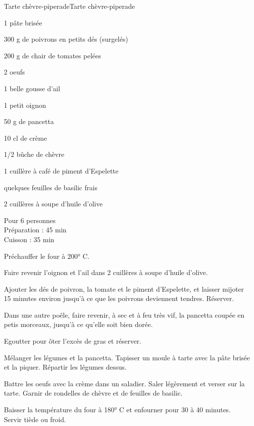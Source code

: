 \begin{recette}{Tarte chèvre-piperade}{Tarte chèvre-piperade}

\begin{ingredients}
1 pâte brisée\par
300 g de poivrons en petits dés (surgelés)\par
200 g de chair de tomates pelées\par
2 oeufs\par
1 belle gousse d'ail\par
1 petit oignon\par
50 g de pancetta\par
10 cl de crème\par
1/2 bûche de chèvre\par
1 cuillère à café de piment d'Espelette\par
quelques feuilles de basilic frais\par
2 cuillères à soupe d'huile d'olive\par
\end{ingredients}

\begin{infos}
Pour 6 personnes\\
Préparation : 45 min\\
Cuisson : 35 min\\
\end{infos}

\begin{etapes}
\item Préchauffer le four à 200° C.
\item Faire revenir l'oignon et l'ail dans 2 cuillères à soupe d'huile d'olive.
\item Ajouter les dés de poivron, la tomate et le piment d'Espelette, et laisser mijoter 15 minutes environ jusqu'à ce que les poivrons deviennent tendres. Réserver.
\item Dans une autre poêle, faire revenir, à sec et à feu très vif, la pancetta coupée en petis morceaux, jusqu'à ce qu'elle soit bien dorée.
\item Egoutter pour ôter l'excès de gras et réserver.
\item Mélanger les légumes et la pancetta. Tapisser un moule à tarte avec la pâte brisée et la piquer. Répartir les légumes dessus.
\item Battre les oeufs avec la crème dans un saladier. Saler légèrement et verser sur la tarte. Garnir de rondelles de chèvre et de feuilles de basilic.
\item Baisser la température du four à 180° C et enfourner pour 30 à 40 minutes. Servir tiède ou froid.
\end{etapes}

\end{recette}